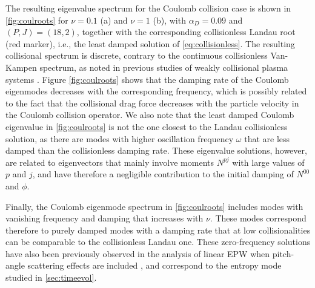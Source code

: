 The resulting eigenvalue spectrum for the Coulomb collision case is shown in \cref{fig:coulroots} for $\nu=0.1$ (a) and $\nu=1$ (b), with $\alpha_D=0.09$ and $(P,J)=(18,2)$, together with the corresponding collisionless {Landau} root (red marker){, i.e., the least damped solution of \cref{eq:collisionless}}.
%
The resulting collisional spectrum is discrete, contrary to the continuous collisionless Van-Kampen spectrum, as noted in previous studies of weakly collisional plasma systems \citep{Ng1999,Bratanov2013}.
%
Figure \ref{fig:coulroots} shows that the damping rate of the Coulomb eigenmodes decreases with the corresponding frequency, which is possibly related to the fact that the collisional drag force decreases with the particle velocity in the Coulomb collision operator.
%
We also note that the least damped Coulomb {eigenvalue} in \cref{fig:coulroots} is not the one closest to the Landau collisionless solution, as there are modes with higher oscillation frequency $\omega$ that are less damped than the collisionless damping rate.
%
{These eigenvalue solutions, however, are related to eigenvectors that mainly involve moments $N^{pj}$ with large values of $p$ and $j$, and have therefore a negligible contribution to the {initial damping} of $N^{00}$ and $\phi$.}

Finally, the Coulomb eigenmode spectrum in \cref{fig:coulroots} includes modes with vanishing frequency and damping that increase{s} with $\nu$.
%
These modes correspond therefore to purely damped modes with a damping rate that at low collisionalities can be {comparable to} the collisionless Landau one.
%
These zero-frequency solutions have also been previously observed in the analysis of linear EPW when pitch-angle scattering effects are included \citep{Epperlein1992, Banks2016}, and correspond to the entropy mode studied in \cref{sec:timeevol}.

